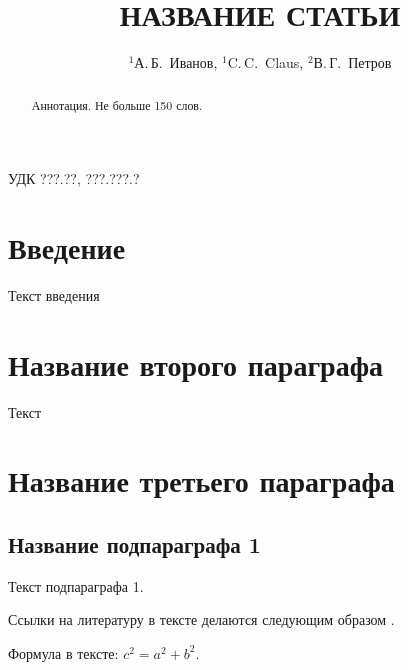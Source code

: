 \documentclass{nsart_eng}
\begin{document}
\title[короткое название статьи]
{НАЗВАНИЕ СТАТЬИ}

\author[А.\,Б.~Иванов, C.\,C.~Claus, В.\,Г.~Петров]
{$^1$А.\,Б.~Иванов, $^{1}$C.\,C.~Claus, $^2$В.\,Г.~Петров}

\address{
$^1$ Санкт-Петербургский Национальный Исследовательский Университет Информационных Технологий, \\
Механики и Оптики,\\
Кронверкский пр., 49, Санкт-Петербург, 197101, Россия\\
$^2$ Swiss Federal University of Technology,\\
Sonneggstrasse, 5,  Zurich, CH-8092, Switzerland }


УДК ???.??, ???.???.?%

\begin{abstract}
Аннотация. Не больше 150 слов.
\end{abstract}


\maketitle

\section{Введение}

Текст введения

\section{Название второго параграфа}
Текст

\section{Название третьего параграфа}

\subsection{Название подпараграфа 1}

Текст подпараграфа 1.

Ссылки на литературу в тексте делаются следующим образом
\cite{1,4}.

Формула в тексте: $c^2=a^2+b^2$.
\end{document}
